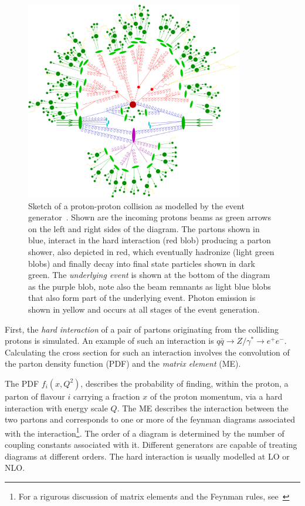 \begin{figure}[htbp]
  \centering
  \includegraphics[width=0.85\textwidth]{PartDetector/Diagrams/scetch.eps}
  \caption{Sketch of a proton-proton collision as modelled by the event generator~\cite{Event}. Shown are the incoming protons beams as green arrows on the left and right sides of the diagram. The partons shown in blue, interact in the hard interaction (red blob) producing a parton shower, also depicted in red, which eventually hadronize (light green blobs) and finally decay into final state particles shown in dark green. The \emph{underlying event} is shown at the bottom of the diagram as the purple blob, note also the beam remnants as light blue blobs that also form part of the underlying event. Photon emission is shown in yellow and occurs at all stages of the event generation.}
  \label{fig:DetectorEGSketch}
\end{figure}

First, the \emph{hard interaction} of a pair of partons originating from the colliding protons is simulated. An example of such an interaction is $q\bar{q} \rightarrow Z / \gamma^{*}\rightarrow e^{+}e^{-}$. Calculating the cross section for such an interaction involves the convolution of the parton density function (PDF) and the \emph{matrix element} (ME).

The PDF $f_i(x,Q^2)$, describes the probability of finding, within the proton, a parton of flavour $i$ carrying a fraction $x$ of the proton momentum, via a hard interaction with energy scale $Q$. The ME describes the interaction between the two partons and corresponds to one or more of the feynman diagrams associated with the interaction\footnote{For a rigurous discussion of matrix elements and the Feynman rules, see~\cite{Theory:Perkins,Theory:IntroGriffiths}}. The order of a diagram is determined by the number of coupling constants associated with it. Different generators are capable of treating diagrams at different orders. The hard interaction is usually modelled at LO or NLO.


